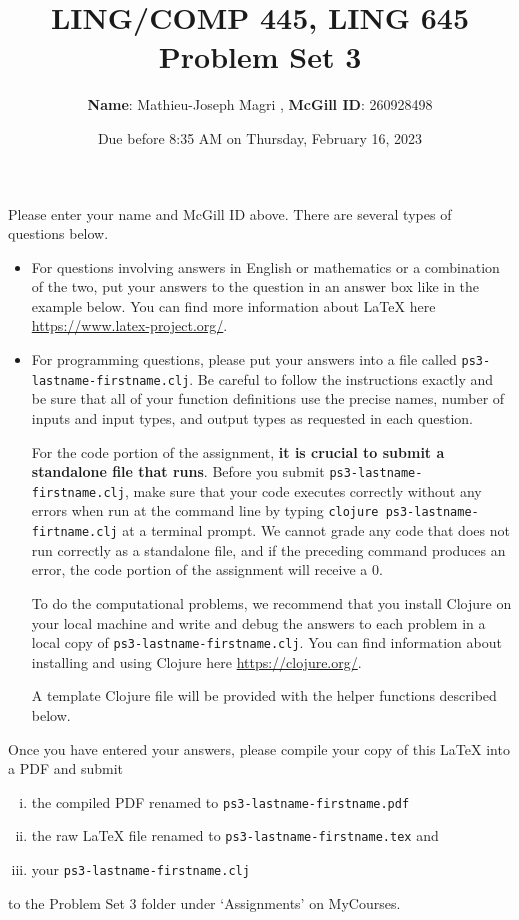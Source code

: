 \documentclass[10pt]{article}
\author{
  \textbf{Name}: Mathieu-Joseph Magri      %
, \textbf{McGill ID}: 260928498  %
}
\newcommand{\PSnum}{3}
\begin{document}
\title{LING/COMP 445, LING 645\\Problem Set \PSnum}
\date{Due before 8:35 AM on Thursday, February 16, 2023}
\maketitle
Please enter your name and McGill ID above.
There are several types of questions below.
\begin{itemize}
\item
For questions involving answers in English or mathematics or a
combination of the two, put your answers to the question in an
answer box like in the example below. You can find more
information about \LaTeX{} here \url{https://www.latex-project.org/}.

\item For programming questions,
please put your answers into a file called
\texttt{ps\PSnum-lastname-firstname.clj}. Be careful to follow the instructions
exactly and be sure that all of your function definitions use the
precise names, number of inputs and input types, and output types as
requested in each question.

For the code portion of the assignment, \textbf{it is crucial to submit a
standalone file that runs}. Before you submit \texttt{ps\PSnum-lastname-firstname.clj},
make sure that your code executes correctly without any errors
when run at the command line by typing
\texttt{clojure ps\PSnum-lastname-firtname.clj} at a terminal
prompt. We cannot grade any code that does not run correctly as a
standalone file, and if the preceding command produces an error,
the code portion of the assignment will receive a $0$.

To do the computational problems, we recommend that you install
Clojure on your local machine and write and debug the answers to each
problem in a local copy of \texttt{ps\PSnum-lastname-firstname.clj}. You can
find information about installing and using Clojure here
\url{https://clojure.org/}.

A template Clojure file will be provided with the helper
functions described below.
\end{itemize}
Once you have entered your answers, please compile your copy of this
\LaTeX{} into a PDF and submit
\begin{enumerate}[(i),noitemsep]
\item
the compiled PDF renamed to
\texttt{ps\PSnum-lastname-firstname.pdf}
\item
the raw \LaTeX{} file renamed to
\texttt{ps\PSnum-lastname-firstname.tex} and
\item
your \texttt{ps\PSnum-lastname-firstname.clj}
\end{enumerate}
to the Problem Set \PSnum{} folder under `Assignments' on MyCourses.
\end{document}
